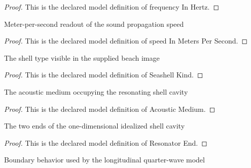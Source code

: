 \begin{proof}
  This is the declared model definition of frequency In Hertz.
\end{proof}
\begin{definition}
  \label{def:physics:phyx-mini-0217:phyxminiproblems-problemphyxmini0217-speedinmeterspersecond}
  Meter-per-second readout of the sound propagation speed
\end{definition}
\begin{proof}
  This is the declared model definition of speed In Meters Per Second.
\end{proof}
\begin{definition}
  \label{def:physics:phyx-mini-0217:phyxminiproblems-problemphyxmini0217-seashellkind}
  The shell type visible in the supplied beach image
\end{definition}
\begin{proof}
  This is the declared model definition of Seashell Kind.
\end{proof}
\begin{definition}
  \label{def:physics:phyx-mini-0217:phyxminiproblems-problemphyxmini0217-acousticmedium}
  The acoustic medium occupying the resonating shell cavity
\end{definition}
\begin{proof}
  This is the declared model definition of Acoustic Medium.
\end{proof}
\begin{definition}
  \label{def:physics:phyx-mini-0217:phyxminiproblems-problemphyxmini0217-resonatorend}
  The two ends of the one-dimensional idealized shell cavity
\end{definition}
\begin{proof}
  This is the declared model definition of Resonator End.
\end{proof}
\begin{definition}
  \label{def:physics:phyx-mini-0217:phyxminiproblems-problemphyxmini0217-acousticboundarycondition}
  Boundary behavior used by the longitudinal quarter-wave model
\end{definition}
